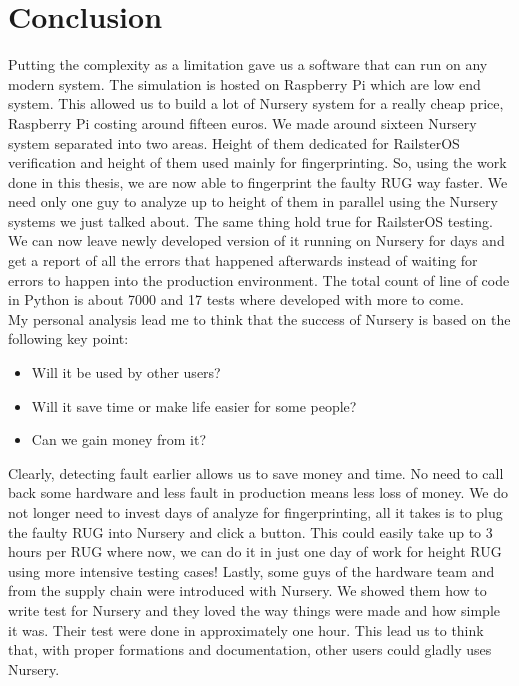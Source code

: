\documentclass[12pt]{article}
\theoremstyle{definition}
\theoremstyle{definition}
\theoremstyle{remark}
\begin{document}

\clearpage
\part{Conclusion}

Putting the complexity as a limitation gave us a software that can run on any modern system. The simulation is hosted on Raspberry Pi which are low end system. This allowed us to build a lot of Nursery system for a really cheap price, Raspberry Pi costing around fifteen euros. We made around sixteen Nursery system separated into two areas. Height of them dedicated for RailsterOS verification and height of them used mainly for fingerprinting. So, using the work done in this thesis, we are now able to fingerprint the faulty RUG way faster. We need only one guy to analyze up to height of them in parallel using the Nursery systems we just talked about. The same thing hold true for RailsterOS testing. We can now leave newly developed version of it running on Nursery for days and get a report of all the errors that happened afterwards instead of waiting for errors to happen into the production environment. The total count of line of code in Python is about 7000 and 17 tests where developed with more to come.\\

My personal analysis lead me to think that the success of Nursery is based on the following key point:
\begin{itemize}
\item Will it be used by other users?
\item Will it save time or make life easier for some people?
\item Can we gain money from it?
\end{itemize}

Clearly, detecting fault earlier allows us to save money and time. No need to call back some hardware and less fault in production means less loss of money. We do not longer need to invest days of analyze for fingerprinting, all it takes is to plug the faulty RUG into Nursery and click a button. This could easily take up to 3 hours per RUG where now, we can do it in just one day of work for height RUG using more intensive testing cases! Lastly, some guys of the hardware team and from the supply chain were introduced with Nursery. We showed them how to write test for Nursery and they loved the way things were made and how simple it was. Their test were done in approximately one hour. This lead us to think that, with proper formations and documentation, other users could gladly uses Nursery.\\
\end{document}
